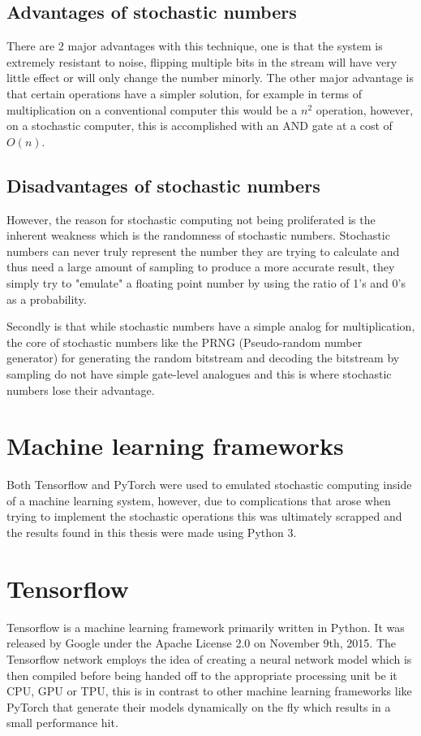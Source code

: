 \documentclass[a4paper,oneside,phd,etd]{BYUPhys}
\begin{document}
\subsection{Advantages of stochastic numbers}
There are 2 major advantages with this technique, one is that the system is extremely resistant to noise\cite{8122049}, flipping multiple bits in the stream will have very little effect or will only change the number minorly. The other major advantage is that certain operations have a simpler solution, for example in terms of multiplication on a conventional computer this would be a $n^2$ operation, however, on a stochastic computer, this is accomplished with an AND gate at a cost of $O(n)$.

\subsection{Disadvantages of stochastic numbers}
However, the reason for stochastic computing not being proliferated is the inherent weakness which is the randomness of stochastic numbers. Stochastic numbers can never truly represent the number they are trying to calculate and thus need a large amount of sampling to produce a more accurate result, they simply try to "emulate" a floating point number by using the ratio of 1's and 0's as a probability.

Secondly is that while stochastic numbers have a simple analog for multiplication, the core of stochastic numbers like the PRNG (Pseudo-random number generator) for generating the random bitstream and decoding the bitstream by sampling do not have simple gate-level analogues and this is where stochastic numbers lose their advantage.


\section{Machine learning frameworks}
Both Tensorflow and PyTorch were used to emulated stochastic computing inside of a machine learning system, however, due to complications that arose when trying to implement the stochastic operations this was ultimately scrapped and the results found in this thesis were made using Python 3.

\section{Tensorflow}
Tensorflow\cite{tensorflow} is a machine learning framework primarily written in Python. It was released by Google under the Apache License 2.0 on November 9th, 2015. The Tensorflow network employs the idea of creating a neural network model which is then compiled before being handed off to the appropriate processing unit be it CPU, GPU or TPU, this is in contrast to other machine learning frameworks like PyTorch that generate their models dynamically on the fly which results in a small performance hit.
\end{document}
